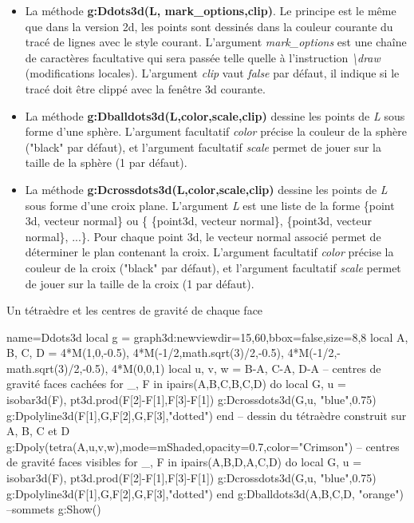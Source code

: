 \begin{itemize}
    \item La méthode \textbf{g:Ddots3d(L, mark\_options,clip)}. Le principe est le même que dans la version 2d, les points sont dessinés dans la couleur courante du tracé de lignes avec le style courant. L'argument \emph{mark\_options} est une chaîne de caractères facultative qui sera passée telle quelle à l'instruction \emph{\textbackslash draw} (modifications locales). L'argument \emph{clip} vaut \emph{false} par défaut, il indique si le tracé doit être clippé avec la fenêtre 3d courante.
    
    \item La méthode \textbf{g:Dballdots3d(L,color,scale,clip)} dessine les points de \emph{L} sous forme d'une sphère. L'argument facultatif \emph{color} précise la couleur de la sphère ("black" par défaut), et l'argument facultatif \emph{scale} permet de jouer sur la taille de la sphère (1 par défaut).
    
    \item La méthode \textbf{g:Dcrossdots3d(L,color,scale,clip)} dessine les points de \emph{L} sous forme d'une croix plane. L'argument \emph{L} est une liste de la forme \{point 3d, vecteur normal\} ou \{ \{point3d, vecteur normal\}, \{point3d, vecteur normal\}, ...\}. Pour chaque point 3d, le vecteur normal associé permet de déterminer le plan contenant la croix. L'argument facultatif \emph{color} précise la couleur de la croix ("black" par défaut), et l'argument facultatif \emph{scale} permet de jouer sur la taille de la croix (1 par défaut).
\end{itemize}

\begin{demo}{Un tétraèdre et les centres de gravité de chaque face}
\begin{luadraw}{name=Ddots3d}
local g = graph3d:new{viewdir={15,60},bbox=false,size={8,8}}
local A, B, C, D = 4*M(1,0,-0.5), 4*M(-1/2,math.sqrt(3)/2,-0.5), 4*M(-1/2,-math.sqrt(3)/2,-0.5), 4*M(0,0,1)
local u, v, w = B-A, C-A, D-A
-- centres de gravité faces cachées
for _, F in ipairs({{A,B,C},{B,C,D}}) do
    local G, u = isobar3d(F), pt3d.prod(F[2]-F[1],F[3]-F[1])
    g:Dcrossdots3d({G,u}, "blue",0.75)
    g:Dpolyline3d({{F[1],G,F[2]},{G,F[3]}},"dotted")
end
-- dessin du tétraèdre construit sur A, B, C et D
g:Dpoly(tetra(A,u,v,w),{mode=mShaded,opacity=0.7,color="Crimson"})
-- centres de gravité faces visibles
for _, F in ipairs({{A,B,D},{A,C,D}}) do
    local G, u = isobar3d(F), pt3d.prod(F[2]-F[1],F[3]-F[1])
    g:Dcrossdots3d({G,u}, "blue",0.75)
    g:Dpolyline3d({{F[1],G,F[2]},{G,F[3]}},"dotted")
end
g:Dballdots3d({A,B,C,D}, "orange") --sommets
g:Show()
\end{luadraw}
\end{demo}

